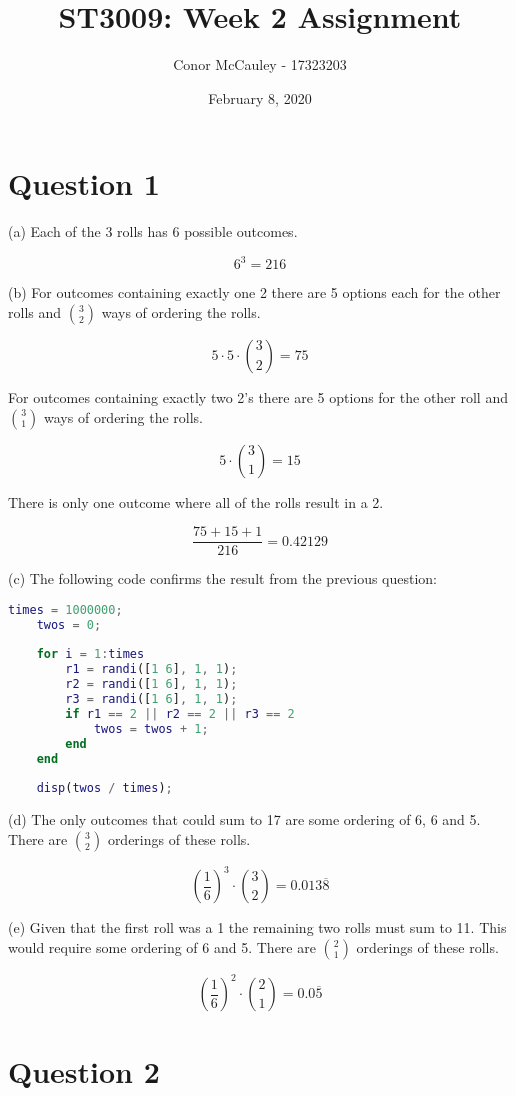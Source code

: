\documentclass[12pt]{article}
\title{ST3009: Week 2 Assignment}
\author{Conor McCauley - 17323203}
\date{February 8, 2020}
\begin{document}
\maketitle

\section*{Question 1}

\noindent (a) Each of the 3 rolls has 6 possible outcomes.

$$ 6 ^ 3 = 216 $$

\noindent (b) For outcomes containing exactly one 2 there are 5 options each for the other rolls and ${3 \choose 2}$ ways of ordering the rolls.

$$ 5 \cdot 5 \cdot {3 \choose 2} = 75 $$

\indent For outcomes containing exactly two 2's there are 5 options for the other roll and ${3 \choose 1}$ ways of ordering the rolls. 

$$ 5 \cdot {3 \choose 1} = 15 $$

\indent There is only one outcome where all of the rolls result in a 2.

$$ \frac{75 + 15 + 1}{216} = 0.42129 $$

\noindent (c) The following code confirms the result from the previous question:

\begin{lstlisting}[language=Matlab]
    times = 1000000;
    twos = 0;
    
    for i = 1:times
        r1 = randi([1 6], 1, 1);
        r2 = randi([1 6], 1, 1);
        r3 = randi([1 6], 1, 1);
        if r1 == 2 || r2 == 2 || r3 == 2
            twos = twos + 1;
        end
    end
    
    disp(twos / times);
\end{lstlisting}

\noindent (d) The only outcomes that could sum to 17 are some ordering of 6, 6 and 5. There are ${3 \choose 2}$ orderings of these rolls.

$$ \left(\frac{1}{6}\right)^3 \cdot {3 \choose 2} = 0.013\overline{8} $$

\noindent (e) Given that the first roll was a 1 the remaining two rolls must sum to 11. This would require some ordering of 6 and 5. There are ${2 \choose 1}$ orderings of these rolls.

$$ \left(\frac{1}{6}\right)^2 \cdot {2 \choose 1} = 0.0\overline{5} $$

\section*{Question 2}
\end{document}
